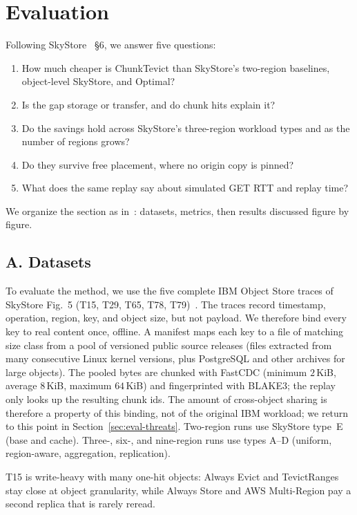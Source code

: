 \section{Evaluation}
\label{sec:eval}

Following SkyStore~\cite{skystore2025} §6, we answer five questions:
\begin{enumerate}
  \item How much cheaper is ChunkTevict than SkyStore's two-region baselines, object-level SkyStore, and Optimal?
  \item Is the gap storage or transfer, and do chunk hits explain it?
  \item Do the savings hold across SkyStore's three-region workload types and as the number of regions grows?
  \item Do they survive free placement, where no origin copy is pinned?
  \item What does the same replay say about simulated {GET} {RTT} and replay time?
\end{enumerate}
We organize the section as in~\cite{ye2021fast}: datasets, metrics, then results discussed figure by figure.

\subsection{A. Datasets}
\label{sec:eval-data}

To evaluate the method, we use the five complete {IBM} Object Store traces of SkyStore Fig.~5 ({T}15, {T}29, {T}65, {T}78, {T}79)~\cite{snia_ibm2019,skystore2025}.
The traces record timestamp, operation, region, key, and object size, but not payload.
We therefore bind every key to real content once, offline.
A manifest maps each key to a file of matching size class from a pool of versioned public source releases (files extracted from many consecutive Linux kernel versions, plus PostgreSQL and other archives for large objects).
The pooled bytes are chunked with Fast{CDC} (minimum $2$\,KiB, average $8$\,KiB, maximum $64$\,KiB) and fingerprinted with {BLAKE3}; the replay only looks up the resulting chunk ids.
The amount of cross-object sharing is therefore a property of this binding, not of the original {IBM} workload; we return to this point in Section~\ref{sec:eval-threats}.
Two-region runs use SkyStore type~E (base and cache).
Three-, six-, and nine-region runs use types {A}--{D} (uniform, region-aware, aggregation, replication).

{T}15 is write-heavy with many one-hit objects: Always Evict and TevictRanges stay close at object granularity, while Always Store and {AWS} Multi-Region pay a second replica that is rarely reread.

